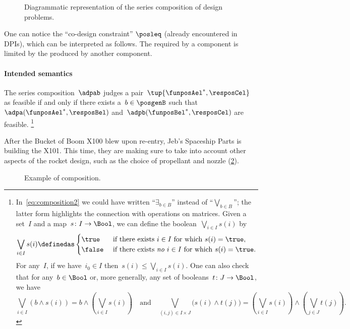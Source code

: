 \begin{figure}[h!]
    \centering
    \caption{Diagrammatic representation of the series composition of design problems. }
    \label{fig:compositiondiagram}
\end{figure}

One can notice the ``co-design constraint'' $\posleq$ (already encountered in DPIs), which can be interpreted as follows.
The  required by a component is limited by the  produced by another component.

\paragraph{Intended semantics}
The series composition~$\adpab$ judges a pair~$\tup{\funposAel^*,\resposCel}$ as feasible if and only if there exists a~$b \in \posgenB$ such that~$\adpa(\funposAel^*,\resposBel)$ and~$\adpb(\funposBel^*,\resposCel)$ are feasible.
\footnote{In~\cref{eq:composition2} we could have written ``$\exists_{b\in B}$'' instead of ``$\bigvee_{b\in B}$''; the latter form highlights the connection with operations on matrices.
Given a set~$I$ and a map~$s\colon I\to\Bool$, we can define the boolean~$\bigvee_{i\in I}s(i)$ by
    \begin{equation*}
        \bigvee_{i\in I}s(i)\definedas
        \begin{cases}
            \true&\text{ if there exists }i\in I\text{ for which }s(i)=\true,\\
            \false&\text{ if there exists \emph{no} }i\in I\text{ for which }s(i)=\true.
        \end{cases}
    \end{equation*}
    For any~$I$, if we have~$i_0\in I$ then~$s(i)\leq\bigvee_{i\in I}s(i)$. One can also check that for any~$b\in\Bool$ or, more generally, any set of booleans~$t\colon J\to\Bool$, we have
    \begin{equation*}
        \bigvee_{i\in I}(b\wedge s(i))=b\wedge\left(\bigvee_{i\in I}s(i)\right)
        \quad\text{and}\quad
        \bigvee_{(i,j)\in I\times  J}\big(s(i)\wedge t(j)\big)=\left(\bigvee_{i\in I}s(i)\right)\wedge\left(\bigvee_{j\in J} t(j)\right).
    \end{equation*}
}

\begin{example}
    After the Bucket of Boom X100 blew upon re-entry, Jeb's Spaceship Parts is building the X101. This time, they are making sure to take into account other aspects of the rocket design, such as the choice of propellant and nozzle (\cref{fig:examplecomposition}).
    \begin{figure}[h!]
        \centering
        \caption{Example of composition. }
        \label{fig:examplecomposition}
    \end{figure}
\end{example}

